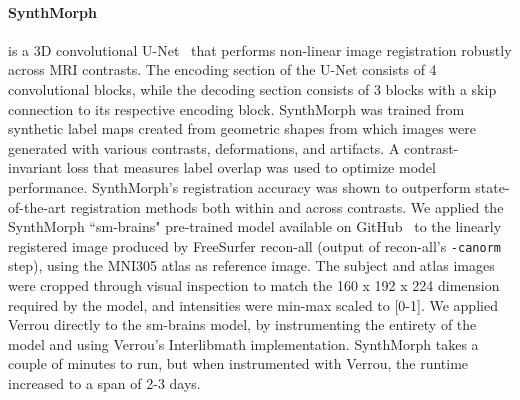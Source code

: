 \paragraph{SynthMorph}\cite{hoffmann2021synthmorph} is a 3D convolutional U-Net~\cite{ronneberger2015u} that performs non-linear image registration robustly across MRI contrasts. The encoding section of the U-Net consists of 4 convolutional blocks, 
while the decoding section consists of 3 blocks 
with a skip connection to its respective encoding block. SynthMorph was trained from synthetic label maps created from geometric shapes from which images were generated with various contrasts, deformations, and artifacts. A contrast-invariant loss that measures label overlap was used to optimize model performance. SynthMorph's registration accuracy was shown to outperform state-of-the-art registration methods both within and across contrasts. We applied the SynthMorph ``sm-brains" pre-trained model available on GitHub~\cite{synthmorph-github} to the linearly registered image produced by FreeSurfer recon-all (output of recon-all's \texttt{-canorm} step), using the MNI305 atlas as reference image. The subject and atlas images were cropped through visual inspection to match the 160 x 192 x 224 dimension required by the model, and intensities were min-max scaled to [0-1]. We applied Verrou directly to the sm-brains model, by instrumenting the entirety of the model and using Verrou's Interlibmath implementation.
SynthMorph takes a couple of minutes to run, but when instrumented with Verrou, the runtime increased to a span of 2-3 days.

